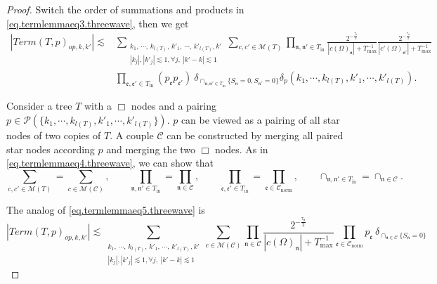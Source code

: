 \begin{proof}
Switch the order of summations and products in \eqref{eq.termlemmaeq3.threewave}, then we get
\begin{equation}\label{eq.termlemmaeq2op.threewave}
\begin{split}
    |Term(T, p)_{op,k,k'}|\lesssim& \sum_{\substack{k_1,\, \cdots,\, k_{l(T)},\, k'_1,\, \cdots,\, k'_{l(T)}, k'\\ |k_{j}|, |k'_j|\lesssim 1, \forall j,\ |k'-k|\lesssim 1}} \sum_{c, c'\in \mathscr{M}(T) }\prod_{\mathfrak{n}, \mathfrak{n}'\in T_{\text{in}}}\frac{2^{-\frac{\tau_{\mathfrak{n}}}{2}}}{|c(\Omega)_{\mathfrak{n}}|+T^{-1}_{\text{max}}}\frac{2^{-\frac{\tau_{\mathfrak{n}}}{2}}}{|c'(\Omega)_{\mathfrak{n}'}|+T^{-1}_{\text{max}}}
    \\
    & \prod_{\mathfrak{e},\mathfrak{e}'\in T_{\text{in}}} (p_{\mathfrak{e}}p_{\mathfrak{e}'})\ \delta_{\cap_{\mathfrak{n},\mathfrak{n}'\in T_{\text{in}}} \{S_{\mathfrak{n}}=0, S_{\mathfrak{n}'}=0\}} \delta_{p}(k_1,\cdots, k_{l(T)}, k'_1,\cdots, k'_{l(T)}).
\end{split}
\end{equation}

Consider a tree $T$ with a $\Box$ nodes and a pairing $p\in \mathcal{P}(\{k_1,\cdots, k_{l(T)}, k'_1,\cdots, k'_{l(T)}\})$. $p$ can be viewed as a pairing of all star nodes of two copies of $T$. A couple $\mathcal{C}$ can be constructed by merging all paired star nodes according $p$ and merging the two $\Box$ nodes. As in \eqref{eq.termlemmaeq4.threewave}, we can show that
\begin{equation}\label{eq.termlemmaeq4op'.threewave}
\sum_{c, c'\in \mathscr{M}(T) }=\sum_{c\in \mathscr{M}(\mathcal{C}) },\qquad \prod_{\mathfrak{n}, \mathfrak{n}'\in T_{\text{in}}}=\prod_{\mathfrak{n}\in \mathcal{C}}, \qquad \prod_{\mathfrak{e},\mathfrak{e}'\in T_{\text{in}}}=\prod_{\mathfrak{e}\in \mathcal{C}_{\text{norm}}},\qquad \cap_{\mathfrak{n},\mathfrak{n}'\in T_{\text{in}}}=\cap_{\mathfrak{n}\in \mathcal{C}}.    
\end{equation}


The analog of \eqref{eq.termlemmaeq5.threewave} is 
\begin{equation}\label{eq.termlemmaeq5op.threewave}
|Term(T, p)_{op,k,k'}|\lesssim \sum_{\substack{k_1,\, \cdots,\, k_{l(T)},\, k'_1,\, \cdots,\, k'_{l(T)}, k'\\ |k_{j}|, |k'_j|\lesssim 1, \forall j,\ |k'-k|\lesssim 1}} \sum_{c\in \mathscr{M}(\mathcal{C}) }\prod_{\mathfrak{n}\in \mathcal{C}}\frac{2^{-\frac{\tau_{\mathfrak{n}}}{2}}}{|c(\Omega)_{\mathfrak{n}}|+T^{-1}_{\text{max}}} \prod_{\mathfrak{e}\in \mathcal{C}_{\text{norm}}} p_{\mathfrak{e}}\  \delta_{\cap_{\mathfrak{n}\in \mathcal{C}} \{S_{\mathfrak{n}}=0\}}
\end{equation}


\end{proof}
